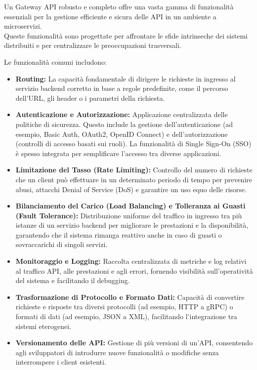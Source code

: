 Un Gateway API robusto e completo offre una vasta gamma di funzionalità essenziali per la gestione efficiente e sicura delle API in un ambiente a microservizi. \\
Queste funzionalità sono progettate per affrontare le sfide intrinseche dei sistemi distribuiti e per centralizzare le preoccupazioni trasversali.

Le funzionalità comuni includono:
\begin{itemize}
    \item \textbf{Routing:} La capacità fondamentale di dirigere le richieste in ingresso al servizio backend corretto in base a regole predefinite, come il percorso dell'URL, gli header o i parametri della richiesta.
    \item \textbf{Autenticazione e Autorizzazione:} Applicazione centralizzata delle politiche di sicurezza. Questo include la gestione dell'autenticazione (ad esempio, Basic Auth, OAuth2, OpenID Connect) e dell'autorizzazione (controlli di accesso basati sui ruoli). La funzionalità di Single Sign-On (SSO) è spesso integrata per semplificare l'accesso tra diverse applicazioni.
    \item \textbf{Limitazione del Tasso (Rate Limiting):} Controllo del numero di richieste che un client può effettuare in un determinato periodo di tempo per prevenire abusi, attacchi Denial of Service (DoS) e garantire un uso equo delle risorse.
    \item \textbf{Bilanciamento del Carico (Load Balancing) e Tolleranza ai Guasti (Fault Tolerance):} Distribuzione uniforme del traffico in ingresso tra più istanze di un servizio backend per migliorare le prestazioni e la disponibilità, garantendo che il sistema rimanga reattivo anche in caso di guasti o sovraccarichi di singoli servizi.
    \item \textbf{Monitoraggio e Logging:} Raccolta centralizzata di metriche e log relativi al traffico API, alle prestazioni e agli errori, fornendo visibilità sull'operatività del sistema e facilitando il debugging.
    \item \textbf{Trasformazione di Protocollo e Formato Dati:} Capacità di convertire richieste e risposte tra diversi protocolli (ad esempio, HTTP a gRPC) o formati di dati (ad esempio, JSON a XML), facilitando l'integrazione tra sistemi eterogenei.
    \item \textbf{Versionamento delle API:} Gestione di più versioni di un'API, consentendo agli sviluppatori di introdurre nuove funzionalità o modifiche senza interrompere i client esistenti.

\end{itemize}
